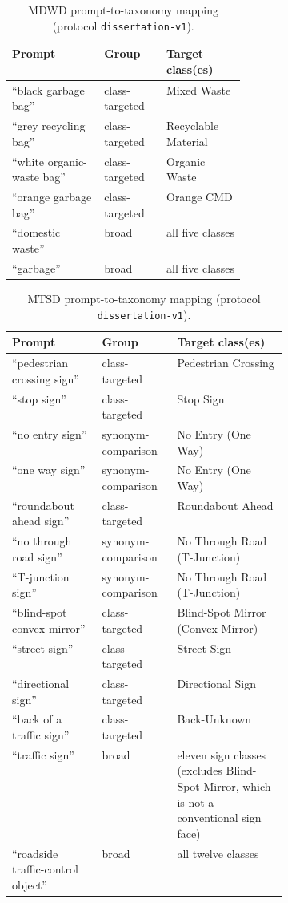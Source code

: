 \begin{table}[htbp]
\centering
\caption{MDWD prompt-to-taxonomy mapping (protocol \texttt{dissertation-v1}).}
\label{tab:mdwd-prompts}
\small
\begin{tabular}{llp{0.34\linewidth}}
\hline
\textbf{Prompt} & \textbf{Group} & \textbf{Target class(es)} \\
\hline
``black garbage bag'' & class-targeted & Mixed Waste \\
``grey recycling bag'' & class-targeted & Recyclable Material \\
``white organic-waste bag'' & class-targeted & Organic Waste \\
``orange garbage bag'' & class-targeted & Orange CMD \\
``domestic waste'' & broad & all five classes \\
``garbage'' & broad & all five classes \\
\hline
\end{tabular}
\end{table}

\begin{table}[htbp]
\centering
\caption{MTSD prompt-to-taxonomy mapping (protocol \texttt{dissertation-v1}).}
\label{tab:mtsd-prompts}
\footnotesize
\begin{tabular}{llp{0.40\linewidth}}
\hline
\textbf{Prompt} & \textbf{Group} & \textbf{Target class(es)} \\
\hline
``pedestrian crossing sign'' & class-targeted & Pedestrian Crossing \\
``stop sign'' & class-targeted & Stop Sign \\
``no entry sign'' & synonym-comparison & No Entry (One Way) \\
``one way sign'' & synonym-comparison & No Entry (One Way) \\
``roundabout ahead sign'' & class-targeted & Roundabout Ahead \\
``no through road sign'' & synonym-comparison & No Through Road (T-Junction) \\
``T-junction sign'' & synonym-comparison & No Through Road (T-Junction) \\
``blind-spot convex mirror'' & class-targeted & Blind-Spot Mirror (Convex Mirror) \\
``street sign'' & class-targeted & Street Sign \\
``directional sign'' & class-targeted & Directional Sign \\
``back of a traffic sign'' & class-targeted & Back-Unknown \\
``traffic sign'' & broad & eleven sign classes (excludes Blind-Spot Mirror, which is not a conventional sign face) \\
``roadside traffic-control object'' & broad & all twelve classes \\
\hline
\end{tabular}
\end{table}

